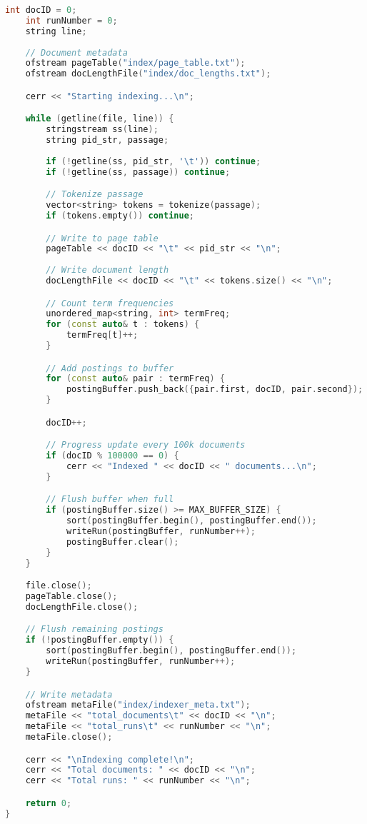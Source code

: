 \documentclass[11pt, a4paper]{report}
\begin{document}
\begin{lstlisting}[language=C++, caption={The complete source code for the indexer component.}, label={lst:indexer}]
    int docID = 0;
    int runNumber = 0;
    string line;
    
    // Document metadata
    ofstream pageTable("index/page_table.txt");
    ofstream docLengthFile("index/doc_lengths.txt");

    cerr << "Starting indexing...\n";

    while (getline(file, line)) {
        stringstream ss(line);
        string pid_str, passage;
        
        if (!getline(ss, pid_str, '\t')) continue;
        if (!getline(ss, passage)) continue;

        // Tokenize passage
        vector<string> tokens = tokenize(passage);
        if (tokens.empty()) continue;

        // Write to page table
        pageTable << docID << "\t" << pid_str << "\n";
        
        // Write document length
        docLengthFile << docID << "\t" << tokens.size() << "\n";

        // Count term frequencies
        unordered_map<string, int> termFreq;
        for (const auto& t : tokens) {
            termFreq[t]++;
        }

        // Add postings to buffer
        for (const auto& pair : termFreq) {
            postingBuffer.push_back({pair.first, docID, pair.second});
        }

        docID++;

        // Progress update every 100k documents
        if (docID % 100000 == 0) {
            cerr << "Indexed " << docID << " documents...\n";
        }

        // Flush buffer when full
        if (postingBuffer.size() >= MAX_BUFFER_SIZE) {
            sort(postingBuffer.begin(), postingBuffer.end());
            writeRun(postingBuffer, runNumber++);
            postingBuffer.clear();
        }
    }

    file.close();
    pageTable.close();
    docLengthFile.close();

    // Flush remaining postings
    if (!postingBuffer.empty()) {
        sort(postingBuffer.begin(), postingBuffer.end());
        writeRun(postingBuffer, runNumber++);
    }

    // Write metadata
    ofstream metaFile("index/indexer_meta.txt");
    metaFile << "total_documents\t" << docID << "\n";
    metaFile << "total_runs\t" << runNumber << "\n";
    metaFile.close();

    cerr << "\nIndexing complete!\n";
    cerr << "Total documents: " << docID << "\n";
    cerr << "Total runs: " << runNumber << "\n";

    return 0;
}
\end{lstlisting}
\end{document}
